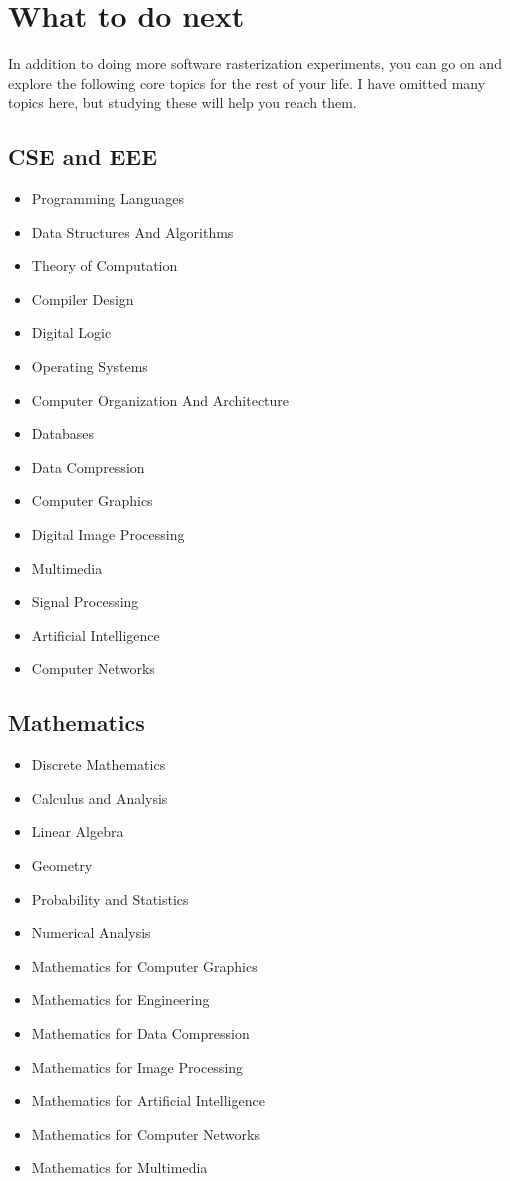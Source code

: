 \chapter{What to do next}
In addition to doing more software rasterization experiments, you can go on and explore the following core topics  for the rest of your life. I have omitted many topics here, but studying these will help you reach them.
\section{CSE and EEE}
\begin{itemize}
	\item Programming Languages
	\item Data Structures And Algorithms
	\item Theory of Computation
	\item Compiler Design
	\item Digital Logic
	\item Operating Systems
	\item Computer Organization And Architecture
	\item Databases
	\item Data Compression
	\item Computer Graphics
	\item Digital Image Processing
	\item Multimedia
	\item Signal Processing
	\item Artificial Intelligence
	\item Computer Networks
\end{itemize}

\section{Mathematics}
\begin{itemize}
	\item Discrete Mathematics
	\item Calculus and Analysis
	\item Linear Algebra
	\item Geometry
	\item Probability and Statistics
	\item Numerical Analysis
	\item Mathematics for Computer Graphics
	\item Mathematics for Engineering
	\item Mathematics for Data Compression
	\item Mathematics for Image Processing
	\item Mathematics for Artificial Intelligence
	\item Mathematics for Computer Networks
	\item Mathematics for Multimedia
\end{itemize}

